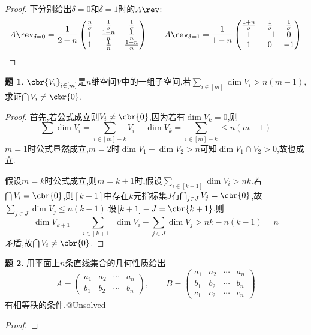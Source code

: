 \documentclass{article}
\theoremstyle{definition}
\newtheorem{exercise}{题}[section]
\begin{document}
\begin{proof}
    下分别给出$\delta=0$和$\delta=1$时的$A\rev$:
    $$A\rev_{\delta=0}=\frac{1}{2-n}\begin{pmatrix}
       \frac{n}{\sigma}&\frac{1}{\sigma}&\frac{1}{\sigma}\\
       1&\frac{1-n}{n}&\frac{1}{n}\\
       1&\frac{1}{n}&\frac{1-n}{n}\\
    \end{pmatrix}\qquad A\rev_{\delta=1}=\frac{1}{1-n}\begin{pmatrix}
       \frac{1+n}{\sigma}&\frac{1}{\sigma}&\frac{1}{\sigma}\\
       1&-1&0\\
       1&0&-1\\
    \end{pmatrix}$$
\end{proof}

\begin{exercise}
    $\cbr{V_i}_{i\in [m]}$是$n$维空间$V$中的一组子空间,若$ \sum_{i\in [m]} \dim V_i>n(m-1)$,求证$\bigcap V_i\neq \cbr{0}$.
\end{exercise}
\begin{proof}
    首先,若公式成立则$V_i\neq \cbr{0}$,因为若有$\dim V_k=0$,则$$\sum \dim V_i=\sum_{i\in [m]-k}V_i+\dim V_k=\sum_{i\in [m]-k}\leq n(m-1)$$
    $m=1$时公式显然成立,$m=2$时$\dim V_1+\dim V_2>n$可知$\dim V_1\cap V_2>0$,故也成立.

    假设$m=k$时公式成立,则$m=k+1$时,假设$\sum_{i\in [k+1]} \dim V_i>nk$.若$\bigcap V_i=\cbr{0}$,则$[k+1]$中存在$k$元指标集$J$有$\bigcap_{j\in J}V_j=\cbr{0}$,故$\sum_{j\in J}\dim V_j\leq n(k-1)$.设$[k+1]-J=\cbr{k+1}$,则$$ \dim V_{k+1}=\sum_{i\in [k+1]}\dim V_i-\sum_{j\in J}\dim V_j>nk-n(k-1)=n$$矛盾,故$\bigcap V_i\neq \cbr{0}$.
\end{proof}

\begin{exercise}
    用平面上$n$条直线集合的几何性质给出$$A=\begin{pmatrix}
        a_1&a_2&\cdots&a_n\\b_1&b_2&\cdots&b_n
     \end{pmatrix},\qquad B=\begin{pmatrix}
        a_1&a_2&\cdots&a_n\\b_1&b_2&\cdots&b_n\\c_1&c_2&\cdots&c_n
     \end{pmatrix}$$有相等秩的条件.@Unsolved
\end{exercise}
\begin{proof}
    
\end{proof}
\end{document}
